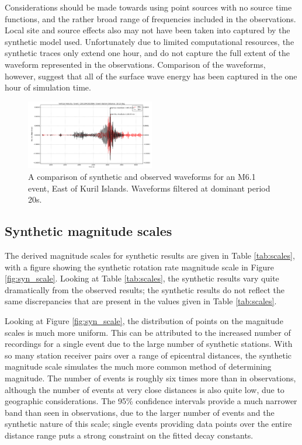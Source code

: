 \documentclass{gji}
\begin{document}
Considerations should be made towards using point sources with no source time functions, %
and the rather broad range of frequencies included in the observations. Local site and source effects also may not have been taken into captured by the synthetic model used. Unfortunately due to limited computational resources, the synthetic traces only extend one hour, and do not capture the full extent of the waveform represented in the observations. Comparison of the waveforms, however, suggest that all of the surface wave energy has been captured in the one hour of simulation time. %

\begin{figure}
\centerline{\includegraphics[width=0.5\textwidth]{both_waveformsC201304191958A}}
\caption{A comparison of synthetic and observed waveforms for an M6.1 event, East of Kuril Islands. Waveforms filtered at dominant period 20s.}
\label{fig:both}
\end{figure}

\subsection{Synthetic magnitude scales}
The derived magnitude scales for synthetic results are given in Table \ref{tab:scales}, with a figure showing the synthetic rotation rate magnitude scale in Figure \ref{fig:syn_scale}. Looking at Table \ref{tab:scales}, the synthetic results vary quite dramatically from the observed results; the synthetic results do not reflect the same discrepancies that are present in the values given in Table \ref{tab:scales}.

Looking at Figure \ref{fig:syn_scale}, the distribution of points on the magnitude scales is much more uniform. This can be attributed to the increased number of recordings for a single event due to the large number of synthetic stations. With so many station receiver pairs over a range of epicentral distances, the synthetic magnitude scale simulates the much more common method of determining magnitude. The number of events is roughly six times more than in observations, although the number of events at very close distances is also quite low, due to geographic considerations. The 95\% confidence intervals provide a much narrower band than seen in observations, due to the larger number of events and the synthetic nature of this scale; single events providing data points over the entire distance range puts a strong constraint on the fitted decay constants.
\end{document}
